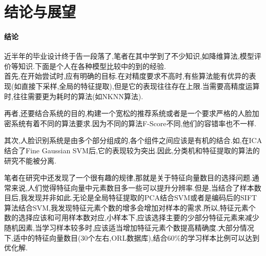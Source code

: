 %

\section{结论与展望}
\paragraph{结论}
近半年的毕业设计终于告一段落了,笔者在其中学到了不少知识,如降维算法,模型评价等知识.下面是个人在各种模型比较中的到的经验.\\


首先,在开始尝试时,应有明确的目标.在对精度要求不高时,有些算法能有优异的表现(如直接下采样,全局的特征提取),但是它的表现往往存在上限.当需要高精度运算时,往往需要更为耗时的算法(如NKNN算法).


再者,还要结合系统的目的,构建一个宽松的推荐系统或者是一个要求严格的人脸加密系统有着不同的算法要求.因为不同的算法F-Score不同,他们的容错率也不一样.


其次,人脸识别系统是由多个部分组成的,各个组件之间应该是有机的结合.如,在ICA结合了Fine Gaussian SVM后,它的表现较为突出.因此,分类机和特征提取的算法的研究不能被分离.


笔者在研究中还发现了一个很有趣的规律,那就是关于特征向量数目的选择问题.通常来说,人们觉得特征向量中元素数目多一些可以提升分辨率.但是,当结合了样本数目后,我发现并非如此.无论是全局特征提取的PCA结合SVM或者是编码后的SIFT算法结合SVM,我发现特征元素个数的增多会增加对样本的需求.所以,特征元素个数的选择应该和可用样本数对应,小样本下,应该选择主要的少部分特征元素来减少随机因素,当学习样本较多时,应该适当增加特征元素个数提高精确度.大部分情况下,适中的特征向量数目(30个左右,ORL数据库),结合60\%的学习样本比例可以达到优化解.


